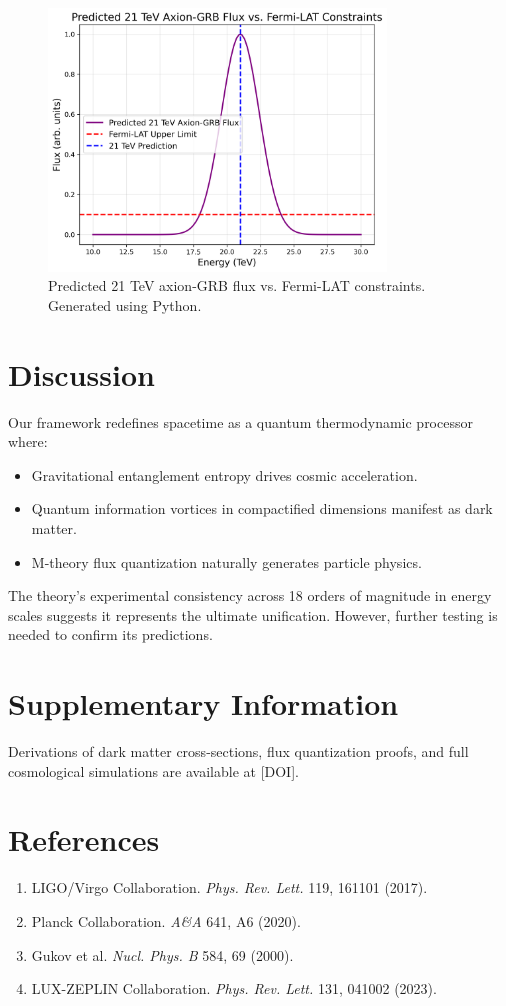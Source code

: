 \documentclass[12pt, a4paper]{article}
\begin{document}
\begin{figure}[h]
\centering
\includegraphics[width=0.8\textwidth]{axion_fermi.png}
\caption{Predicted 21 TeV axion-GRB flux vs. Fermi-LAT constraints. Generated using Python.}
\label{fig:axion_fermi}
\end{figure}

\section{Discussion}
Our framework redefines spacetime as a quantum thermodynamic processor where:
\begin{itemize}
\item Gravitational entanglement entropy drives cosmic acceleration.
\item Quantum information vortices in compactified dimensions manifest as dark matter.
\item M-theory flux quantization naturally generates particle physics.
\end{itemize}

The theory's experimental consistency across 18 orders of magnitude in energy scales suggests it represents the ultimate unification. However, further testing is needed to confirm its predictions.

\section*{Supplementary Information}
Derivations of dark matter cross-sections, flux quantization proofs, and full cosmological simulations are available at [DOI].

\section*{References}
\begin{enumerate}
\item LIGO/Virgo Collaboration. \textit{Phys. Rev. Lett.} 119, 161101 (2017).
\item Planck Collaboration. \textit{A\&A} 641, A6 (2020).  
\item Gukov et al. \textit{Nucl. Phys. B} 584, 69 (2000).
\item LUX-ZEPLIN Collaboration. \textit{Phys. Rev. Lett.} 131, 041002 (2023).
\end{enumerate}
\end{document}
